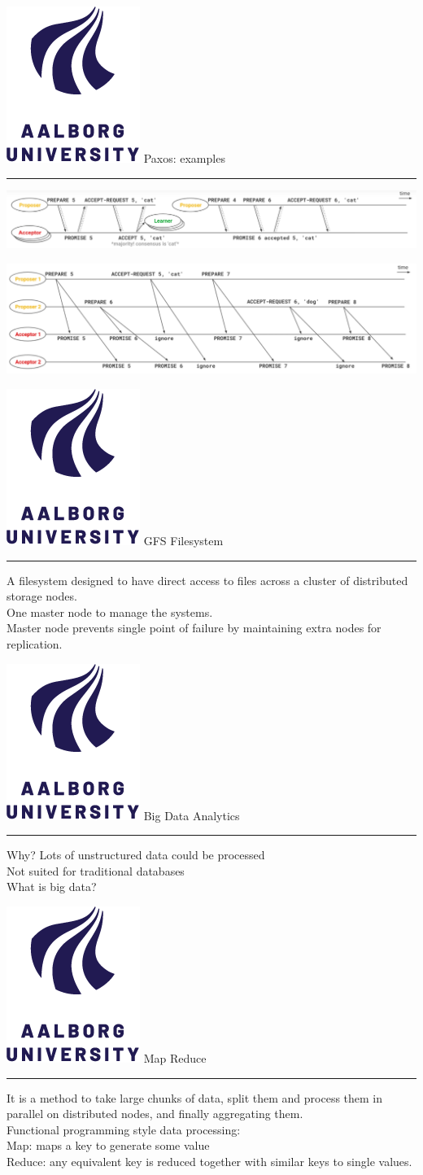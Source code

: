 \documentclass[aspectratio=1610,17pt,utf8]{beamer}
\newcommand{\mainframe}[1]{\color{blue} \includegraphics[width=.05\textwidth]{figures/aau.png} #1\\\color{black}\hrule}
\newcommand{\regularframe}[1]{\color{black}\includegraphics[width=.05\textwidth]{figures/aau.png} #1\\\hrule}
\begin{document}
\begin{frame}{\regularframe{Paxos: examples}}
    \includegraphics[width=\textwidth]{figures/paxos1.png}
    \vspace{30pt}

    \includegraphics[width=\textwidth]{figures/paxos2.png}
\end{frame}

\begin{frame}{\regularframe{GFS Filesystem}}
    A filesystem designed to have direct access to files across a cluster of distributed storage nodes.\\
    One master node to manage the systems.\\
    Master node prevents single point of failure by maintaining extra nodes for replication.
\end{frame}


\begin{frame}{\mainframe{Big Data Analytics}}
    Why? Lots of unstructured data could be processed\\
    Not suited for traditional databases\\
    What is big data?
\end{frame}

\begin{frame}{\regularframe{Map Reduce}}
    It is a method to take large chunks of data, split them and process them in parallel on distributed nodes, and finally aggregating them.\\
    Functional programming style data processing:\\
    Map: maps a key to generate some value\\
    Reduce: any equivalent key is reduced together with similar keys to single values.\\
\end{frame}
\end{document}
